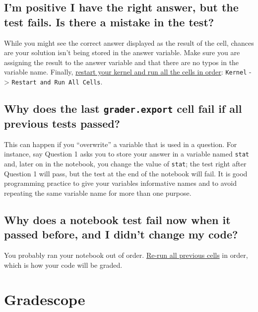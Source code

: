 \documentclass[
  letterpaper,
  DIV=11,
  numbers=noendperiod]{scrreprt}
\begin{document}
\subsection{I'm positive I have the right answer, but the test fails. Is
there a mistake in the
test?}\label{im-positive-i-have-the-right-answer-but-the-test-fails.-is-there-a-mistake-in-the-test}

While you might see the correct answer displayed as the result of the
cell, chances are your solution isn't being stored in the answer
variable. Make sure you are assigning the result to the answer variable
and that there are no typos in the variable name. Finally,
\href{https://ds100.org/debugging-guide/jupyter101/jupyter101.html\#restarting-kernel}{restart
your kernel and run all the cells in order}: \texttt{Kernel}
-\textgreater{} \texttt{Restart\ and\ Run\ All\ Cells}.

\subsection{\texorpdfstring{Why does the last \texttt{grader.export}
cell fail if all previous tests
passed?}{Why does the last grader.export cell fail if all previous tests passed?}}\label{why-does-the-last-grader.export-cell-fail-if-all-previous-tests-passed}

This can happen if you ``overwrite'' a variable that is used in a
question. For instance, say Question 1 asks you to store your answer in
a variable named \texttt{stat} and, later on in the notebook, you change
the value of \texttt{stat}; the test right after Question 1 will pass,
but the test at the end of the notebook will fail. It is good
programming practice to give your variables informative names and to
avoid repeating the same variable name for more than one purpose.

\subsection{Why does a notebook test fail now when it passed before, and
I didn't change my
code?}\label{why-does-a-notebook-test-fail-now-when-it-passed-before-and-i-didnt-change-my-code}

You probably ran your notebook out of order.
\href{https://ds100.org/debugging-guide/jupyter101/jupyter101.html\#running-cells}{Re-run
all previous cells} in order, which is how your code will be graded.

\section{Gradescope}\label{gradescope}
\end{document}
